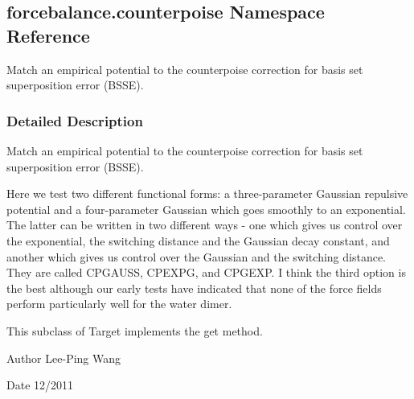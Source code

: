 \hypertarget{namespaceforcebalance_1_1counterpoise}{}\subsection{forcebalance.\+counterpoise Namespace Reference}
\label{namespaceforcebalance_1_1counterpoise}


Match an empirical potential to the counterpoise correction for basis set superposition error (B\+S\+SE).  




\subsubsection{Detailed Description}
Match an empirical potential to the counterpoise correction for basis set superposition error (B\+S\+SE). 

Here we test two different functional forms\+: a three-\/parameter Gaussian repulsive potential and a four-\/parameter Gaussian which goes smoothly to an exponential. The latter can be written in two different ways -\/ one which gives us control over the exponential, the switching distance and the Gaussian decay constant, and another which gives us control over the Gaussian and the switching distance. They are called \textquotesingle{}C\+P\+G\+A\+U\+SS\textquotesingle{}, \textquotesingle{}C\+P\+E\+X\+PG\textquotesingle{}, and \textquotesingle{}C\+P\+G\+E\+XP\textquotesingle{}. I think the third option is the best although our early tests have indicated that none of the force fields perform particularly well for the water dimer.

This subclass of Target implements the \textquotesingle{}get\textquotesingle{} method.

\begin{DoxyAuthor}{Author}
Lee-\/\+Ping Wang 
\end{DoxyAuthor}
\begin{DoxyDate}{Date}
12/2011 
\end{DoxyDate}
